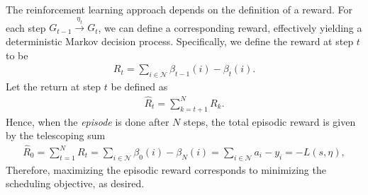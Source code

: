 \documentclass[a4paper]{article}
\theoremstyle{definition}
\theoremstyle{plain}
\begin{document}
The reinforcement learning approach depends on the definition of a reward. For
each step $G_{t-1} \xrightarrow{\eta_{t}} G_{t}$, we can define a corresponding
reward, effectively yielding a deterministic Markov decision process.
Specifically, we define the reward at step $t$ to be
\begin{align*}
  R_{t} = \sum_{i \in \mathcal{N}} \beta_{t-1}(i) - \beta_{t}(i) .
\end{align*}
Let the return at step $t$ be defined as
\begin{align*}
  \hat{R}_{t} = \sum_{k=t + 1}^{N} R_{k} .
\end{align*}
Hence, when the \textit{episode} is done after $N$ steps, the total episodic
reward is given by the telescoping sum
\begin{align*}
  \hat{R}_{0} = \sum_{t=1}^{N} R_{t} = \sum_{i \in \mathcal{N}} \beta_{0}(i) - \beta_{N}(i)  = \sum_{i \in \mathcal{N}} a_{i} - y_{i} = - L(s, \eta) ,
\end{align*}
Therefore, maximizing the episodic reward corresponds to minimizing the
scheduling objective, as desired.
%
\end{document}
